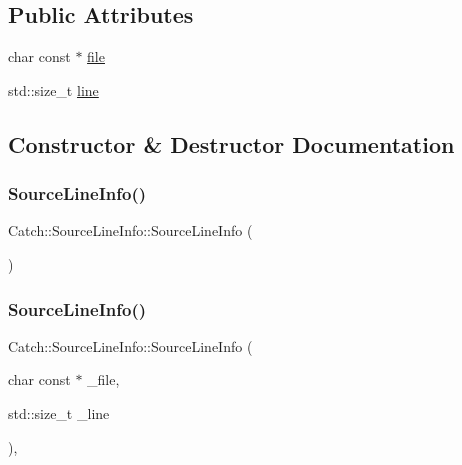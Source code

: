 \subsection*{Public Attributes}
\begin{DoxyCompactItemize}
\item 
char const  $\ast$ \mbox{\hyperlink{struct_catch_1_1_source_line_info_ad65537703e9f08c1fa7777fbc3f0c617}{file}}
\item 
std\+::size\+\_\+t \mbox{\hyperlink{struct_catch_1_1_source_line_info_a841e5d696c7b9cde24e45e61dd979c77}{line}}
\end{DoxyCompactItemize}


\subsection{Constructor \& Destructor Documentation}
\mbox{\label{struct_catch_1_1_source_line_info_a2d80932bb4129b1606d1924a5c44be2f}} 
\subsubsection{\texorpdfstring{Source\+Line\+Info()}{SourceLineInfo()}\hspace{0.1cm}{\footnotesize\ttfamily [1/4]}}
{\footnotesize\ttfamily Catch\+::\+Source\+Line\+Info\+::\+Source\+Line\+Info (\begin{DoxyParamCaption}{ }\end{DoxyParamCaption})\hspace{0.3cm}{\ttfamily [delete]}}

\mbox{\label{struct_catch_1_1_source_line_info_a48510b82a39a042ab370ed143dd30c10}} 
\subsubsection{\texorpdfstring{Source\+Line\+Info()}{SourceLineInfo()}\hspace{0.1cm}{\footnotesize\ttfamily [2/4]}}
{\footnotesize\ttfamily Catch\+::\+Source\+Line\+Info\+::\+Source\+Line\+Info (\begin{DoxyParamCaption}\item[{char const $\ast$}]{\+\_\+file,  }\item[{std\+::size\+\_\+t}]{\+\_\+line }\end{DoxyParamCaption})\hspace{0.3cm}{\ttfamily [inline]}, {\ttfamily [noexcept]}}

